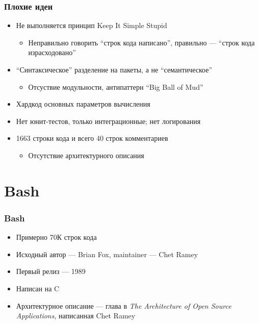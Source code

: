 \documentclass{../../slides-style}
\begin{document}
    \begin{frame}
        \frametitle{Плохие идеи}
        \begin{itemize}
            \item Не выполняется принцип Keep It Simple Stupid
            \begin{itemize}
                \item Неправильно говорить ``строк кода написано'', правильно --- ``строк кода израсходовано''
            \end{itemize}
            \item ``Синтаксическое'' разделение на пакеты, а не ``семантическое''
            \begin{itemize}
                \item Отсуствие модульности, антипаттерн ``Big Ball of Mud''
            \end{itemize}
            \item Хардкод основных параметров вычисления
            \item Нет юнит-тестов, только интеграционные; нет логирования
            \item 1663 строки кода и всего 40 строк комментариев
            \begin{itemize}
                \item Отсутствие архитектурного описания
            \end{itemize}
        \end{itemize}
    \end{frame}

    \section{Bash}

    \begin{frame}
        \frametitle{Bash}
        \begin{itemize}
            \item Примерно 70К строк кода
            \item Исходный автор --- Brian Fox, maintainer --- Chet Ramey
            \item Первый релиз --- 1989
            \item Написан на C
            \item Архитектурное описание --- глава в \textit{The Architecture of Open Source Applications}, написанная Chet Ramey
        \end{itemize}
    \end{frame}
\end{document}

